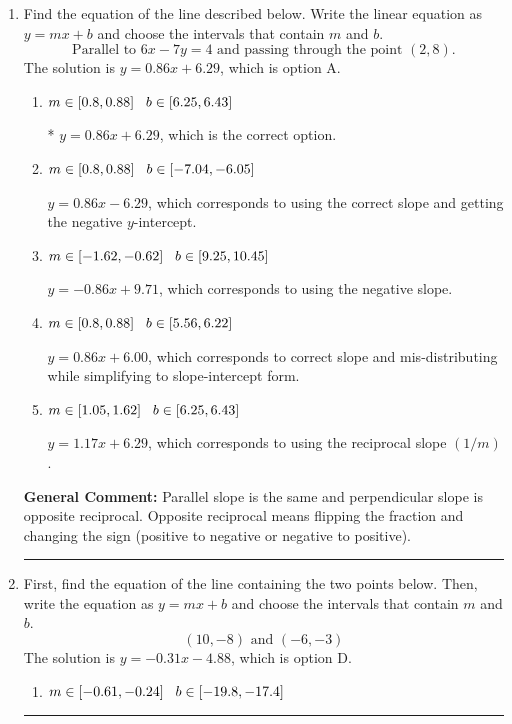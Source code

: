 \documentclass{extbook}[14pt]
\newcommand{\litem}[1]{\item #1

\rule{\textwidth}{0.4pt}}
\begin{document}
\begin{enumerate}\litem{
Find the equation of the line described below. Write the linear equation as $ y=mx+b $ and choose the intervals that contain $m$ and $b$.
\[ \text{Parallel to } 6 x - 7 y = 4 \text{ and passing through the point } (2, 8). \]
The solution is \( y = 0.86x + 6.29 \), which is option A.\begin{enumerate}[label=\Alph*.]
\item \( m \in [0.8, 0.88] \hspace*{3mm} b \in [6.25, 6.43] \)

* $y = 0.86x + 6.29$, which is the correct option.
\item \( m \in [0.8, 0.88] \hspace*{3mm} b \in [-7.04, -6.05] \)

 $y = 0.86x - 6.29$, which corresponds to using the correct slope and getting the negative $y$-intercept.
\item \( m \in [-1.62, -0.62] \hspace*{3mm} b \in [9.25, 10.45] \)

 $y = -0.86x + 9.71$, which corresponds to using the negative slope.
\item \( m \in [0.8, 0.88] \hspace*{3mm} b \in [5.56, 6.22] \)

 $y = 0.86x + 6.00$, which corresponds to correct slope and mis-distributing while simplifying to slope-intercept form.
\item \( m \in [1.05, 1.62] \hspace*{3mm} b \in [6.25, 6.43] \)

 $y = 1.17x + 6.29$, which corresponds to using the reciprocal slope $(1/m)$.
\end{enumerate}

\textbf{General Comment:} Parallel slope is the same and perpendicular slope is opposite reciprocal. Opposite reciprocal means flipping the fraction and changing the sign (positive to negative or negative to positive).
}
\litem{
First, find the equation of the line containing the two points below. Then, write the equation as $ y=mx+b $ and choose the intervals that contain $m$ and $b$.
\[ (10, -8) \text{ and } (-6, -3) \]
The solution is \( y = -0.31x -4.88 \), which is option D.\begin{enumerate}[label=\Alph*.]
\item \( m \in [-0.61, -0.24] \hspace*{3mm} b \in [-19.8, -17.4] \)


\end{enumerate}}
\end{enumerate}
\end{document}
